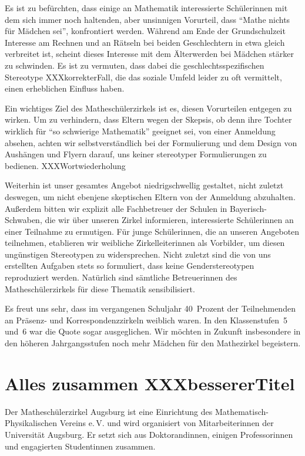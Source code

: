 \documentclass[12pt]{zettel}
\newcommand{\twopics}[2]{%
  \begin{figure}[b]
    \makebox[\textwidth][c]{%
      \texttt{[image: impressionen/\#1]}%
      \hspace*{1cm}%
      \texttt{[image: impressionen/\#2]}%
    }
  \end{figure}
}
\begin{document}
Es ist zu befürchten, dass einige an Mathematik interessierte Schülerinnen mit dem sich immer noch haltenden, aber unsinnigen Vorurteil, dass "`Mathe nichts für Mädchen sei"',
konfrontiert werden. Während am Ende der Grundschulzeit Interesse am Rechnen und an Rätseln bei beiden Geschlechtern in etwa gleich verbreitet ist, scheint dieses Interesse mit
dem Älterwerden bei Mädchen stärker zu schwinden. Es ist zu vermuten, dass dabei die geschlechtsspezifischen Stereotype XXXkorrekterFall, die das soziale Umfeld leider zu oft vermittelt, einen
erheblichen Einfluss haben.

Ein wichtiges Ziel des Matheschülerzirkels ist es, diesen Vorurteilen entgegen zu wirken. Um zu verhindern, dass Eltern wegen der Skepsis, ob denn ihre
Tochter wirklich für "`so schwierige Mathematik"' geeignet sei, von einer Anmeldung absehen, achten wir selbstverständlich bei der Formulierung und dem Design von Aushängen und Flyern
darauf, uns keiner stereotyper Formulierungen zu bedienen. XXXWortwiederholung

Weiterhin ist unser gesamtes Angebot niedrigschwellig gestaltet, nicht zuletzt deswegen, um nicht ebenjene skeptischen Eltern
von der Anmeldung abzuhalten. Außerdem bitten wir explizit alle Fachbetreuer der Schulen in Bayerisch-Schwaben, die wir über unseren Zirkel informieren, interessierte Schülerinnen an
einer Teilnahme zu ermutigen. Für junge Schülerinnen, die an unseren Angeboten teilnehmen, etablieren wir weibliche Zirkelleiterinnen als Vorbilder, um diesen ungünstigen Stereotypen zu
widersprechen. Nicht zuletzt sind die von uns erstellten Aufgaben stets so formuliert, dass keine Genderstereotypen reproduziert werden. Natürlich sind sämtliche Betreuerinnen des
Matheschülerzirkels für diese Thematik sensibilisiert.

Es freut uns sehr, dass im vergangenen Schuljahr
40~Prozent der Teilnehmenden an Präsenz- und Korrespondenzzirkeln weiblich waren. In den Klassenstufen~5 und~6 war die Quote sogar ausgeglichen. Wir möchten in Zukunft insbesondere
in den höheren Jahrgangsstufen noch mehr Mädchen für den Mathezirkel begeistern.

\twopics{klein-01}{klein-02}

\section{Alles zusammen XXXbessererTitel}

Der Matheschülerzirkel Augsburg ist eine Einrichtung des
Mathematisch-Phy\-si\-ka\-li\-schen Vereins e.\,V. und wird organisiert von
Mitarbeiterinnen der Universität
Augsburg. Er setzt sich aus Doktorandinnen,
einigen Professorinnen und engagierten Studentinnen zusammen.
\end{document}

